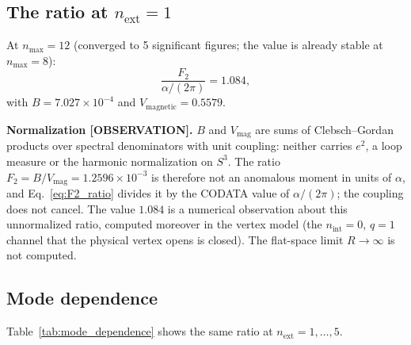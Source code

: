 \documentclass[11pt]{article}
\begin{document}
\subsection{The ratio at $n_{\mathrm{ext}} = 1$}

At $n_{\max} = 12$ (converged to 5 significant figures; the value is
already stable at $n_{\max} = 8$):
\begin{equation}
  \frac{F_2}{\alpha/(2\pi)} = 1.084,
  \label{eq:F2_ratio}
\end{equation}
with $B = 7.027 \times 10^{-4}$ and
$V_{\mathrm{magnetic}} = 0.5579$.

\noindent\textbf{Normalization [OBSERVATION].}  $B$ and
$V_{\mathrm{mag}}$ are sums of Clebsch--Gordan products over spectral
denominators with unit coupling: neither carries $e^2$, a loop measure
or the harmonic normalization on $S^3$.  The ratio
$F_2 = B/V_{\mathrm{mag}} = 1.2596 \times 10^{-3}$ is therefore not an
anomalous moment in units of $\alpha$, and Eq.~\eqref{eq:F2_ratio}
divides it by the CODATA value of $\alpha/(2\pi)$; the coupling does
not cancel.  The value $1.084$ is a numerical observation about this
unnormalized ratio, computed moreover in the vertex model (the
$n_{\mathrm{int}} = 0$, $q = 1$ channel that the physical vertex opens
is closed).  The flat-space limit $R \to \infty$ is not computed.

\subsection{Mode dependence}
\label{sec:mode_dependence}

Table~\ref{tab:mode_dependence} shows the same ratio at
$n_{\mathrm{ext}} = 1, \ldots, 5$.
\end{document}
